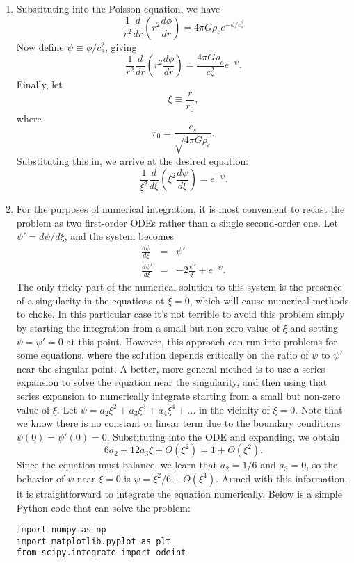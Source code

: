 \begin{enumerate}
\begin{enumerate}
\item Substituting into the Poisson equation, we have
\begin{displaymath}
\frac{1}{r^2}\frac{d}{dr}\left(r^2 \frac{d\phi}{dr}\right) = 4 \pi G \rho_c e^{-\phi/c_s^2}
\end{displaymath}
Now define $\psi \equiv \phi/c_s^2$, giving
\begin{displaymath}
\frac{1}{r^2}\frac{d}{dr}\left(r^2 \frac{d\phi}{dr}\right) = \frac{4\pi G \rho_c}{c_s^2} e^{-\psi}.
\end{displaymath}
Finally, let
\begin{displaymath}
\xi \equiv \frac{r}{r_0},
\end{displaymath}
where 
\begin{displaymath}
r_0 = \frac{c_s}{\sqrt{4\pi G\rho_c}}.
\end{displaymath}
Substituting this in, we arrive at the desired equation:
\begin{displaymath}
\frac{1}{\xi^2}\frac{d}{d\xi}\left(\xi^2 \frac{d\psi}{d\xi}\right) = e^{-\psi}.
\end{displaymath}

\item For the purposes of numerical integration, it is most convenient to recast the problem as two first-order ODEs rather than a single second-order one. Let $\psi' = d\psi/d\xi$, and the system becomes
\begin{eqnarray*}
\frac{d\psi}{d\xi} & = & \psi' \\
\frac{d\psi'}{d\xi} & = & -2\frac{\psi'}{\xi} + e^{-\psi}.
\end{eqnarray*}
The only tricky part of the numerical solution to this system is the presence of a singularity in the equations at $\xi = 0$, which will cause numerical methods to choke. In this particular case it's not terrible to avoid this problem simply by starting the integration from a small but non-zero value of $\xi$ and setting $\psi = \psi' = 0$ at this point. However, this approach can run into problems for some equations, where the solution depends critically on the ratio of $\psi$ to $\psi'$ near the singular point. A better, more general method is to use a series expansion to solve the equation near the singularity, and then using that series expansion to numerically integrate starting from a small but non-zero value of $\xi$. Let $\psi = a_2 \xi^2 + a_3 \xi^3 + a_4 \xi^4 + \ldots$ in the vicinity of $\xi = 0$. Note that we know there is no constant or linear term due to the boundary conditions $\psi(0) = \psi'(0) = 0$. Substituting into the ODE and expanding, we obtain
\begin{displaymath}
6 a_2 + 12 a_3 \xi + O(\xi^2) = 1 + O(\xi^2).
\end{displaymath}
Since the equation must balance, we learn that $a_2 = 1/6$ and $a_3 = 0$, so the behavior of $\psi$ near $\xi = 0$ is $\psi = \xi^2/6 + O(\xi^4)$. Armed with this information, it is straightforward to integrate the equation numerically. Below is a simple Python code that can solve the problem:
\begin{verbatim}
import numpy as np
import matplotlib.pyplot as plt
from scipy.integrate import odeint


\end{verbatim}
\end{enumerate}
\end{enumerate}
